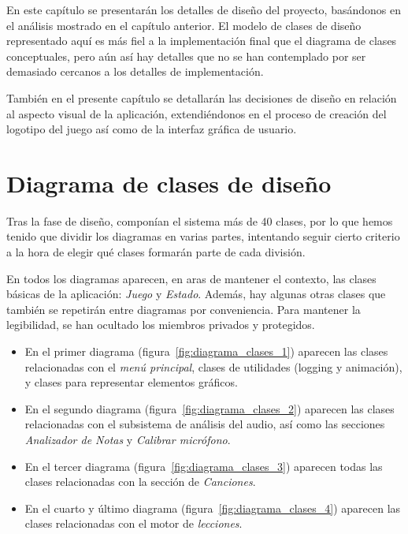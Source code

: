 En este capítulo se presentarán los detalles de diseño del proyecto, basándonos
en el análisis mostrado en el capítulo anterior. El modelo de clases de diseño
representado aquí es más fiel a la implementación final que el diagrama de
clases conceptuales, pero aún así hay detalles que no se han contemplado por ser
demasiado cercanos a los detalles de implementación.

También en el presente capítulo se detallarán las decisiones de diseño en
relación al aspecto visual de la aplicación, extendiéndonos en el proceso de
creación del logotipo del juego así como de la interfaz gráfica de usuario.

\section{Diagrama de clases de diseño}

Tras la fase de diseño, componían el sistema más de 40 clases, por lo que hemos
tenido que dividir los diagramas en varias partes, intentando seguir cierto
criterio a la hora de elegir qué clases formarán parte de cada división.

En todos los diagramas aparecen, en aras de mantener el contexto, las clases
básicas de la aplicación: \textit{Juego} y \textit{Estado}. Además, hay algunas
otras clases que también se repetirán entre diagramas por conveniencia. Para
mantener la legibilidad, se han ocultado los miembros privados y protegidos.

\begin{itemize}
\item En el primer diagrama (figura~\ref{fig:diagrama_clases_1}) aparecen las clases
  relacionadas con el \textit{menú principal}, clases de utilidades (logging y
  animación), y clases para representar elementos gráficos.
\item En el segundo diagrama (figura~\ref{fig:diagrama_clases_2}) aparecen las
  clases relacionadas con el subsistema de análisis del audio, así como las
  secciones \textit{Analizador de Notas} y \textit{Calibrar micrófono}.
\item En el tercer diagrama (figura~\ref{fig:diagrama_clases_3}) aparecen todas las
  clases relacionadas con la sección de \textit{Canciones}.
\item En el cuarto y último diagrama (figura~\ref{fig:diagrama_clases_4}) aparecen
  las clases relacionadas con el motor de \textit{lecciones}.
\end{itemize}

